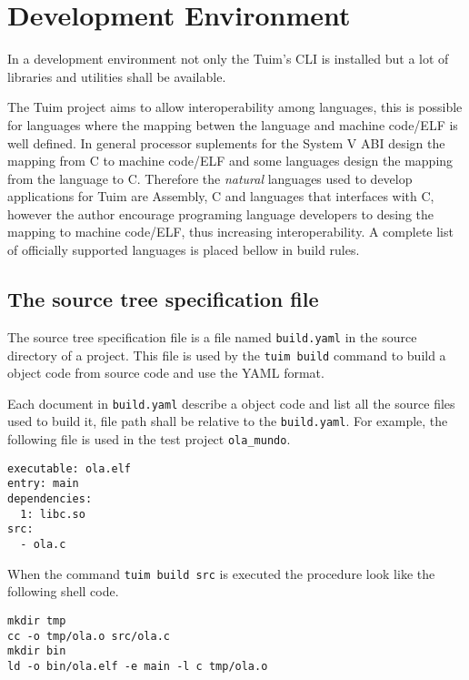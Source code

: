 \chapter{Development Environment}

In a development environment not only the Tuim's CLI is installed but a
lot of libraries and utilities shall be available.

The Tuim project aims to allow interoperability among languages,
this is possible for languages where the mapping
betwen the language and machine code/ELF is well defined.
In general processor suplements for the System V ABI design the mapping
from C to machine code/ELF and some languages design the mapping
from the language to C.
Therefore the \textit{natural} languages used to develop applications
for Tuim are Assembly, C and languages that interfaces with C,
however the author encourage programing language developers to desing
the mapping to machine code/ELF, thus increasing interoperability.
A complete list of officially supported languages is placed bellow in
build rules.

\section{The source tree specification file}

The source tree specification file is a file named
\texttt{build.yaml} in the source directory of a project.
This file is used by the \texttt{tuim build} command to build a object code
from source code and use the YAML\cite{yaml} format.

Each document in \texttt{build.yaml} describe a object code
and list all the source files used to build it,
file path shall be relative to the \texttt{build.yaml}.
For example, the following file is used in the test project \texttt{ola\_mundo}.

\begin{lstlisting}[style=yaml]
executable: ola.elf
entry: main
dependencies:
  1: libc.so
src:
  - ola.c
\end{lstlisting}

When the command \texttt{tuim build src} is executed the procedure look like
the following shell code.

\begin{lstlisting}[style=bash]
mkdir tmp
cc -o tmp/ola.o src/ola.c
mkdir bin
ld -o bin/ola.elf -e main -l c tmp/ola.o
\end{lstlisting}

